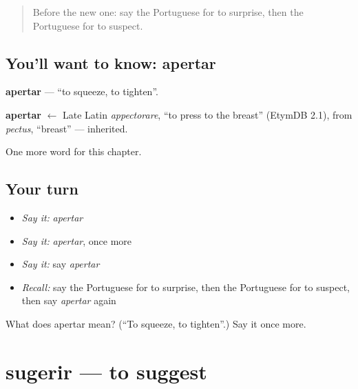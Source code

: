 \label{lesson:PT-C238-apertar}



\begin{quote}
Before the new one: say the Portuguese for to surprise, then the Portuguese for to suspect.
\end{quote}

\subsection*{You'll want to know: apertar}
\textbf{apertar} — \textquotedblleft{}to squeeze, to tighten\textquotedblright{}.

\begin{cousinweb}
\textbf{apertar} $\leftarrow$ Late Latin \emph{appectorare}, \textquotedblleft{}to press to the breast\textquotedblright{} (EtymDB 2.1), from \emph{pectus}, \textquotedblleft{}breast\textquotedblright{} — inherited.
\end{cousinweb}

\begin{grammarlens}[title={What you've built}]
One more word for this chapter.
\end{grammarlens}

\subsection*{Your turn}
\begin{itemize}
\raggedright
  \item \emph{Say it:} \emph{apertar}
  \item \emph{Say it:} \emph{apertar}, once more
  \item \emph{Say it:} say \emph{apertar}
  \item \emph{Recall:} say the Portuguese for to surprise, then the Portuguese for to suspect, then say \emph{apertar} again
\end{itemize}

\begin{tcolorbox}[breakable,colback=teal!4,colframe=teal!35!black,title={Before you move on}]
What does apertar mean? (\textquotedblleft{}To squeeze, to tighten\textquotedblright{}.) Say it once more.
\end{tcolorbox}
\section[sugerir]{sugerir — to suggest}

\label{lesson:PT-C238-sugerir}



